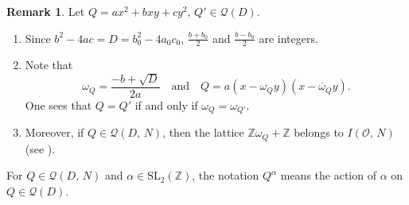 \documentclass[reqno,11pt]{article}
\theoremstyle{plain} %
\theoremstyle{definition} %
\newtheorem{remark}[theorem]{\indent\sc Remark}
\begin{document}
\begin{remark}\label{QQzz}
Let $Q=ax^2+bxy+cy^2,\,Q'\in\mathcal{Q}(D)$. 
\begin{enumerate}
\item[(i)] Since $b^2-4ac=D=b_0^2-4a_0c_0$,  $\displaystyle\frac{b+b_0}{2}$ 
and $\displaystyle\frac{b-b_0}{2}$ are integers.
\item[(ii)] 
Note that 
\begin{equation*}
\omega_Q=\frac{-b+\sqrt{D}}{2a}\quad\textrm{and}\quad
Q=a(x-\omega_Qy)(x-\overline{\omega}_Qy).
\end{equation*}
One sees that $Q=Q'$ if and only if $\omega_Q=\omega_{Q'}$. 
\item[(iii)] Moreover, if $Q\in\mathcal{Q}(D,\,N)$, then
the lattice $\mathbb{Z}\omega_Q+\mathbb{Z}$
belongs to $I(\mathcal{O},\,N)$ (see \cite[Theorem 7.7 (i) and (7.16)]{Cox}). 
\end{enumerate}
\end{remark}

For $Q\in\mathcal{Q}(D,\,N)$ and $\alpha\in\mathrm{SL}_2(\mathbb{Z})$, 
the notation $Q^\alpha$ means the action of $\alpha$ on $Q\in\mathcal{Q}(D)$. 
\end{document}
